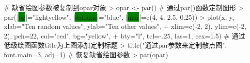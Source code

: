 \begin{frame}[t, fragile]{\subsecname}{}
\begin{overlayarea}{\textwidth}{\textheight}
\begin{onlyenv}
\begin{columns}
        \begin{column}{.6\textwidth}
 \centering
\begin{rcode}
# 缺省绘图参数被复制到opar对象
> opar <- par()
# 通过par()函数定制图形
> par(|\colorbox{green}{bg}|="lightyellow", |\colorbox{green}{col.axis}|="blue", |\colorbox{green}{mar}|=c(4, 4, 2.5, 0.25))
> plot(x, y, xlab="Ten random values", ylab="Ten other values",
+ xlim=c(-2, 2), ylim=c(-2, 2), pch=22, col="red", bg="yellow",
+ bty="l", tcl=-.25, las=1, cex=1.5)
# 通过低级绘图函数title为上图添加定制标题
> title("通过par参数来定制散点图", font.main=3, adj=1)
# 恢复缺省绘图参数
> par(opar)
\end{rcode}
        \end{column}
      \end{columns}
\end{onlyenv}
\end{overlayarea}  
\end{frame}

\begin{frame}{\subsecname}{}

\end{frame}


